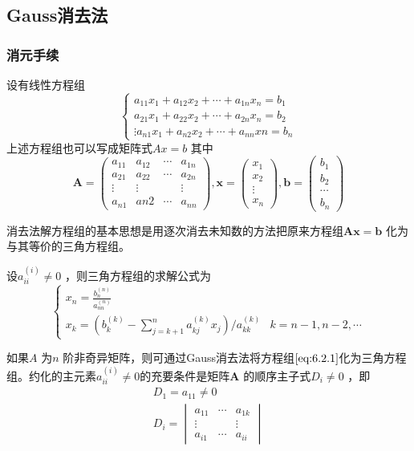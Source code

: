 \documentclass[a4paper]{article}
\begin{document}
\subsection{Gauss消去法}
\subsubsection{消元手续}
设有线性方程组
\[
\tag{6.2.1} \label{eq:6.2.1} 
\begin{cases}
	a_{11} x_1 + a_{12} x_2 + \cdots + a_{1n} x_n = b_1 \\
	a_{21} x_1 + a_{22} x_2 + \cdots + a_{2n} x_{n} = b_2 \\
	\vdots
	a_{n1} x_1 + a_{n2} x_2 + \cdots + a_{nn} xn = b_{n}
\end{cases} 
\] 
上述方程组也可以写成矩阵式$Ax = b$ 
其中
\[
	\mathbf{A} = \begin{pmatrix}
	a_{11} & a_{12} & \cdots & a_{1n} \\
	a_{21} & a_{22} & \cdots & a_{2n} \\
	\vdots & \vdots & & \vdots \\
	a_{n1} & a{n2} & \cdots & a_{nn}
\end{pmatrix} ,
\mathbf{x} = \begin{pmatrix} x_1 \\ x_2 \\ \vdots \\x_n \end{pmatrix} ,
\mathbf{b} = \begin{pmatrix} b_1 \\ b_2 \\ \cdots \\ b_n \end{pmatrix} 
\] 

消去法解方程组的基本思想是用逐次消去未知数的方法把原来方程组$\mathbf{Ax} = \mathbf{b}$ 化为与其等价的三角方程组。

设$a_{ii}^{(i)} \neq 0$ ，则三角方程组的求解公式为
\[
	\tag{6.5.2} \label{eq:6.5.2} 
\begin{cases}
	x_{n} = \frac{b_n^{(n)}}{a_{nn}^{(n)}} \\
	x_{k} = (b_{k}^{(k)} - \sum_{j=k+1}^{n} a_{kj}^{(k)} x_{j}) / a_{kk}^{(k)} & k = n-1, n-2,\cdots
\end{cases} 
\] 

\begin{theorem}
	如果$A$ 为$n$ 阶非奇异矩阵，则可通过Gauss消去法将方程组$\ref{eq:6.2.1}$化为三角方程组。约化的主元素$a_{ii}^{(i)} \neq 0$的充要条件是矩阵$\mathbf{A}$ 的顺序主子式$D_i \neq 0$ ，即
	\[
		\begin{align*}
	D_1 = a_{11} \neq 0 \\
	D_i = \begin{vmatrix} a_{11} & \cdots & a_{1k} \\ 
		\vdots & & \vdots \\
		a_{i1} & \cdots & a_{ii} 
	\end{vmatrix} 
		\end{align*}
	\] 
\end{theorem}
\end{document}
